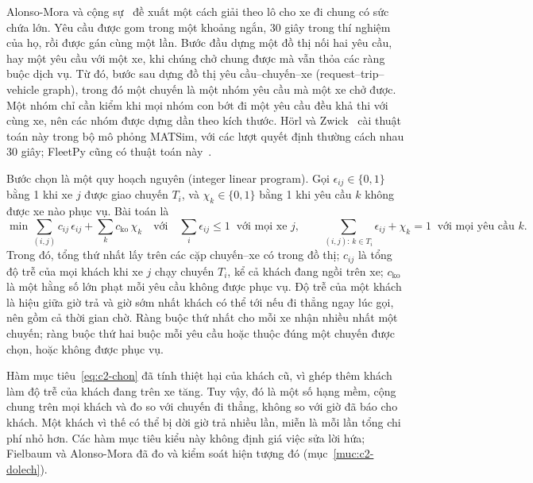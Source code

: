 Alonso-Mora và cộng sự~\cite{alonsomora2017} đề xuất một cách giải theo lô cho xe đi chung có sức chứa lớn. Yêu cầu
được gom trong một khoảng ngắn, 30 giây trong thí nghiệm của họ, rồi được gán cùng một lần. Bước đầu dựng một đồ thị
nối hai yêu cầu, hay một yêu cầu với một xe, khi chúng chở chung được mà vẫn thỏa các ràng buộc dịch vụ. Từ đó, bước
sau dựng đồ thị yêu cầu--chuyến--xe (request--trip--vehicle graph), trong đó một chuyến là một nhóm yêu cầu mà một xe
chở được. Một nhóm chỉ cần kiểm khi mọi nhóm con bớt đi một yêu cầu đều khả thi với cùng xe, nên các nhóm được dựng
dần theo kích thước. Hörl và Zwick~\cite{horl2022} cài thuật toán này trong bộ mô phỏng MATSim, với các lượt quyết
định thường cách nhau 30 giây; FleetPy cũng có thuật toán này~\cite{engelhardt2026}.

Bước chọn là một quy hoạch nguyên (integer linear program). Gọi $\epsilon_{ij} \in \{0, 1\}$ bằng 1 khi xe $j$ được
giao chuyến $T_i$, và $\chi_k \in \{0, 1\}$ bằng 1 khi yêu cầu $k$ không được xe nào phục vụ. Bài toán là
\begin{equation}
\min \sum_{(i,j)} c_{ij}\,\epsilon_{ij} + \sum_{k} c_{\mathrm{ko}}\,\chi_k
\quad\text{với}\quad
\sum_{i} \epsilon_{ij} \le 1 \;\;\text{với mọi xe } j, \qquad
\sum_{(i,j):\, k \in T_i} \epsilon_{ij} + \chi_k = 1 \;\;\text{với mọi yêu cầu } k .
\label{eq:c2-chon}
\end{equation}
Trong đó, tổng thứ nhất lấy trên các cặp chuyến--xe có trong đồ thị; $c_{ij}$ là tổng độ trễ của mọi khách khi xe $j$
chạy chuyến $T_i$, kể cả khách đang ngồi trên xe; $c_{\mathrm{ko}}$ là một hằng số lớn phạt mỗi yêu cầu không được
phục vụ. Độ trễ của một khách là hiệu giữa giờ trả và giờ sớm nhất khách có thể tới nếu đi thẳng ngay lúc gọi, nên
gồm cả thời gian chờ. Ràng buộc thứ nhất cho mỗi xe nhận nhiều nhất một chuyến; ràng buộc thứ hai buộc mỗi yêu cầu
hoặc thuộc đúng một chuyến được chọn, hoặc không được phục vụ.

Hàm mục tiêu~\eqref{eq:c2-chon} đã tính thiệt hại của khách cũ, vì ghép thêm khách làm độ trễ của khách đang trên xe
tăng. Tuy vậy, đó là một số hạng mềm, cộng chung trên mọi khách và đo so với chuyến đi thẳng, không so với giờ đã báo
cho khách. Một khách vì thế có thể bị dời giờ trả nhiều lần, miễn là mỗi lần tổng chi phí nhỏ hơn. Các hàm mục tiêu
kiểu này không định giá việc sửa lời hứa; Fielbaum và Alonso-Mora đã đo và kiểm soát hiện tượng đó
(mục~\ref{muc:c2-dolech}).

